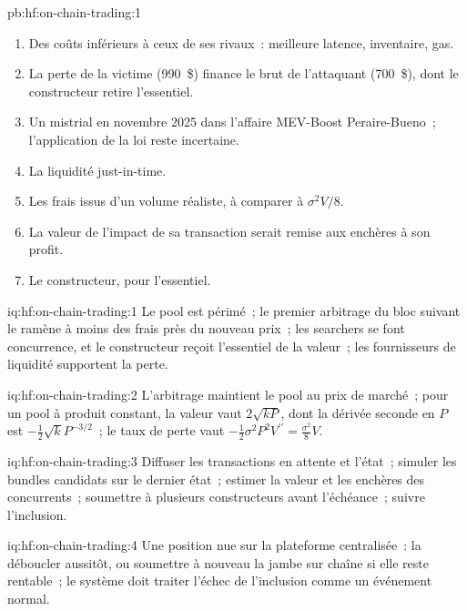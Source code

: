 \begin{solution}{pb:hf:on-chain-trading:1}
\begin{enumerate}
semaine, à des frais de 0.3~\%, après 26.000~\$ de loss-versus-rebalancing.
\item Des coûts inférieurs à ceux de ses rivaux~: meilleure latence, inventaire, gas.
\item La perte de la victime (990~\$) finance le brut de l'attaquant (700~\$), dont le constructeur retire l'essentiel.
\item Un mistrial en novembre 2025 dans l'affaire MEV-Boost Peraire-Bueno~; l'application de la loi reste incertaine.
\item La liquidité just-in-time.
\item Les frais issus d'un volume réaliste, à comparer à $\sigma^2V/8$.
\item La valeur de l'impact de sa transaction serait remise aux enchères à son profit.
\item Le constructeur, pour l'essentiel.
\end{enumerate}
\end{solution}

\begin{solution}{iq:hf:on-chain-trading:1}
Le pool est périmé~; le premier arbitrage du bloc suivant le ramène à moins des frais près du nouveau prix~; les searchers se font concurrence, et
le constructeur reçoit l'essentiel de la valeur~; les fournisseurs de liquidité supportent la perte.
\end{solution}

\begin{solution}{iq:hf:on-chain-trading:2}
L'arbitrage maintient le pool au prix de marché~; pour un pool à produit constant, la valeur vaut $2\sqrt{kP}$, dont la dérivée seconde en $P$ est
$-\frac12\sqrt k P^{-3/2}$~; le taux de perte vaut $-\frac12\sigma^2P^2V^{\prime\prime}=\frac{\sigma^2}{8}V$.
\end{solution}

\begin{solution}{iq:hf:on-chain-trading:3}
Diffuser les transactions en attente et l'état~; simuler les bundles candidats sur le dernier état~; estimer la valeur et les enchères des concurrents~; soumettre à
plusieurs constructeurs avant l'échéance~; suivre l'inclusion.
\end{solution}

\begin{solution}{iq:hf:on-chain-trading:4}
Une position nue sur la plateforme centralisée~: la déboucler aussitôt, ou soumettre à nouveau la jambe sur chaîne si elle reste rentable~; le système doit traiter
l'échec de l'inclusion comme un événement normal.
\end{solution}

